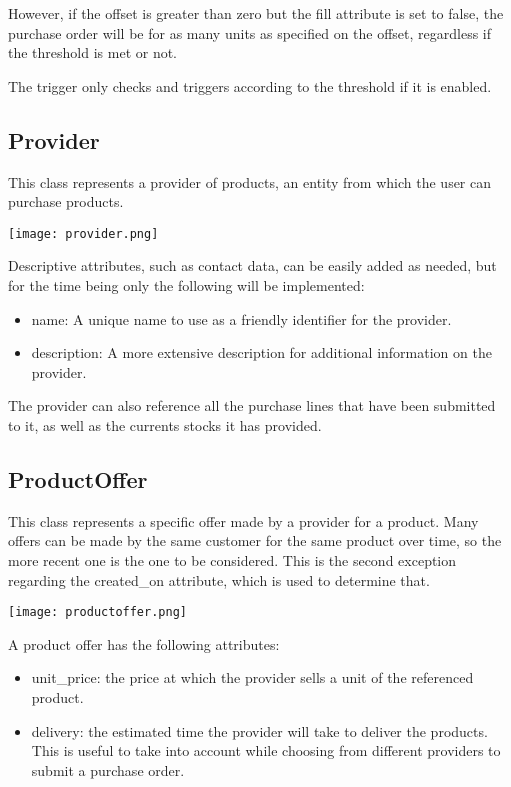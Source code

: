 However, if the offset is greater than zero but the fill attribute is set to false, the purchase order will be for as many units as specified on the offset, regardless if the threshold is met or not.

The trigger only checks and triggers according to the threshold if it is enabled.

\subsection{Provider}
This class represents a provider of products, an entity from which the user can purchase products. 
\begin{center}
\texttt{[image: provider.png]}
\end{center}
Descriptive attributes, such as contact data, can be easily added as needed, but for the time being only the following will be implemented:

\begin{itemize}
\item name: A unique name to use as a friendly identifier for the provider.
\item description: A more extensive description for additional information on the provider.
\end{itemize}

The provider can also reference all the purchase lines that have been submitted to it, as well as the currents stocks it has provided.

\subsection{ProductOffer}
This class represents a specific offer made by a provider for a product. Many offers can be made by the same customer for the same product over time, so the more recent one is the one to be considered. This is the second exception regarding the created\_on attribute, which is used to determine that.
\begin{center}
\texttt{[image: productoffer.png]}
\end{center}
A product offer has the following attributes:

\begin{itemize}
\item unit\_price: the price at which the provider sells a unit of the referenced product.
\item delivery: the estimated time the provider will take to deliver the products. This is useful to take into account while choosing from different providers to submit a purchase order.
\end{itemize}

